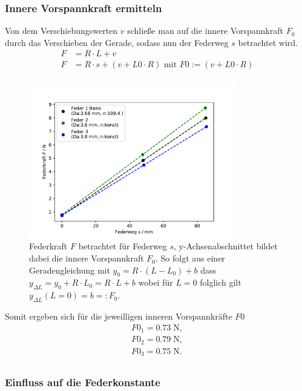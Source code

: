 \subsubsection{Innere Vorspannkraft ermitteln}
\label{sec:vorspannkraft}
Von dem Verschiebungswerten $v$ schließe man auf die innere Vorspannkraft $F_0$ durch das Verschieben
der Gerade, sodass nun der Federweg $s$ betrachtet wird.
\begin{align*}
  F&=R \cdot L + v\\
  F&=R \cdot s + (v+L0 \cdot R) \text{ mit }F0:= (v+L0 \cdot R) \\
\end{align*}
\begin{figure}[H]
  \center
  \includegraphics[width=0.8\textwidth]{plots/f0_123_dia.pdf}
  \caption
  {
    Federkraft $F$ betrachtet für Federweg $s$, y-Achsenabschnittet bildet dabei die innere Vorspannkraft $F_0$.
    So folgt aus einer Geradengleichung mit $y_0=R\cdot(L-L_0)+b$ dass $y_{\Delta L}=y_0+R \cdot L_0=R \cdot L+b$
    wobei für $L=0$ folglich gilt $y_{\Delta L}(L=0)=b=:F_0$.
  }
\end{figure}
Somit ergeben sich für die jeweilligen inneren Vorspannkräfte $F0$
\begin{align*}
  F0_1=  0.73 \;\si{\N},\\
  F0_2=  0.79 \;\si{\N},\\
  F0_3=  0.75 \;\si{\N}.\\
\end{align*}


\subsubsection{Einfluss auf die Federkonstante}

